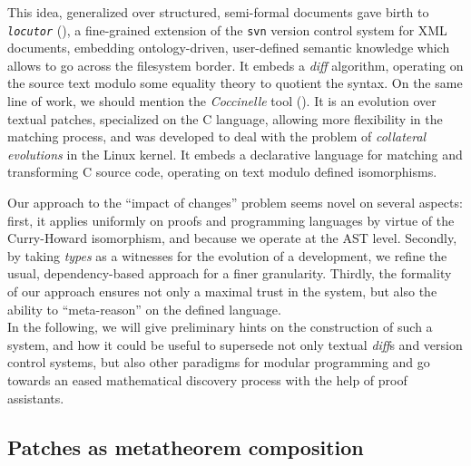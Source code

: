 \documentclass[twoside,a4paper,12pt]{article}
\begin{document}
This idea, generalized over structured, semi-formal documents gave
birth to \texttt{\it locutor} (\cite{muller2008fine}), a fine-grained
extension of the \texttt{svn} version control system for XML
documents, embedding ontology-driven, user-defined semantic knowledge
which allows to go across the filesystem border. It embeds a
\emph{diff} algorithm, operating on the source text modulo some
equality theory to quotient the syntax. On the same line of work, we
should mention the \emph{Coccinelle} tool
(\cite{padioleau2008documenting}). It is an evolution over textual
patches, specialized on the C language, allowing more flexibility in
the matching process, and was developed to deal with the problem of
\emph{collateral evolutions} in the Linux kernel. It embeds a
declarative language for matching and transforming C source code,
operating on text modulo defined isomorphisms.

Our approach to the ``impact of changes'' problem seems novel on
several aspects: first, it applies uniformly on proofs and programming
languages by virtue of the Curry-Howard isomorphism, and because we
operate at the AST level. Secondly, by taking \emph{types} as a
witnesses for the evolution of a development, we refine the usual,
dependency-based approach for a finer granularity. Thirdly, the
formality of our approach ensures not only a maximal trust in the
system, but also the ability to ``meta-reason'' on the defined
language.
\\

In the following, we will give preliminary hints on the construction
of such a system, and how it could be useful to supersede not only
textual \emph{diff}s and version control systems, but also other
paradigms for modular programming and go towards an eased mathematical
discovery process with the help of proof assistants.

\subsection{Patches as metatheorem composition}
\end{document}
